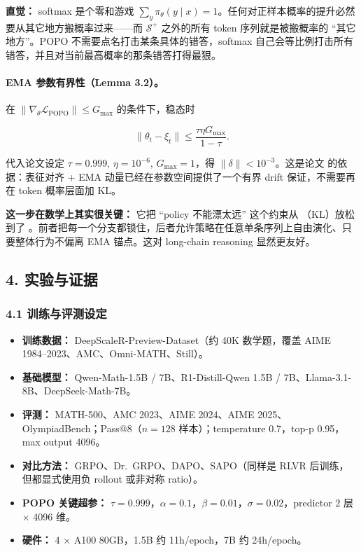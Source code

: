 \begin{intubox}
\textbf{直觉：} softmax 是个零和游戏 $\sum_y \pi_\theta(y\mid x)=1$。任何对正样本概率的提升必然要从其它地方搬概率过来——而 $\mathcal{S}^{+}$ 之外的所有 token 序列就是被搬概率的 ``其它地方''。POPO 不需要点名打击某条具体的错答，softmax 自己会等比例打击所有错答，并且对当前最高概率的那条错答打得最狠。
\end{intubox}

\paragraph{EMA 参数有界性（Lemma 3.2）。}
在 $\|\nabla_\theta\mathcal{L}_{\text{POPO}}\|\le G_{\max}$ 的条件下，稳态时

\[
\|\theta_t-\xi_t\|\le \frac{\tau\eta G_{\max}}{1-\tau}.
\]

代入论文设定 $\tau=0.999,\,\eta=10^{-6},\,G_{\max}=1$，得 $\|\delta\|<10^{-3}$。这是论文  的依据：表征对齐 + EMA 动量已经在参数空间提供了一个有界 drift 保证，不需要再在 token 概率层面加 KL。

\begin{warnbox}
\textbf{这一步在数学上其实很关键：} 它把 ``policy 不能漂太远'' 这个约束从 （KL）放松到了 。前者把每一个分支都锁住，后者允许策略在任意单条序列上自由演化、只要整体行为不偏离 EMA 锚点。这对 long-chain reasoning 显然更友好。
\end{warnbox}

\subsection{4. 实验与证据}

\subsubsection{4.1 训练与评测设定}

\begin{itemize}[leftmargin=1.5em]
  \item \textbf{训练数据：} DeepScaleR-Preview-Dataset（约 40K 数学题，覆盖 AIME 1984--2023、AMC、Omni-MATH、Still）。
  \item \textbf{基础模型：} Qwen-Math-1.5B / 7B、R1-Distill-Qwen 1.5B / 7B、Llama-3.1-8B、DeepSeek-Math-7B。
  \item \textbf{评测：} MATH-500、AMC 2023、AIME 2024、AIME 2025、OlympiadBench；Pass@8（$n=128$ 样本）；temperature 0.7，top-p 0.95，max output 4096。
  \item \textbf{对比方法：} GRPO、Dr.~GRPO、DAPO、SAPO（同样是 RLVR 后训练，但都显式使用负 rollout 或非对称 ratio）。
  \item \textbf{POPO 关键超参：} $\tau=0.999$，$\alpha=0.1$，$\beta=0.01$，$\sigma=0.02$，predictor 2 层 $\times$ 4096 维。
  \item \textbf{硬件：} 4 $\times$ A100 80GB，1.5B 约 11h/epoch，7B 约 24h/epoch。
\end{itemize}

